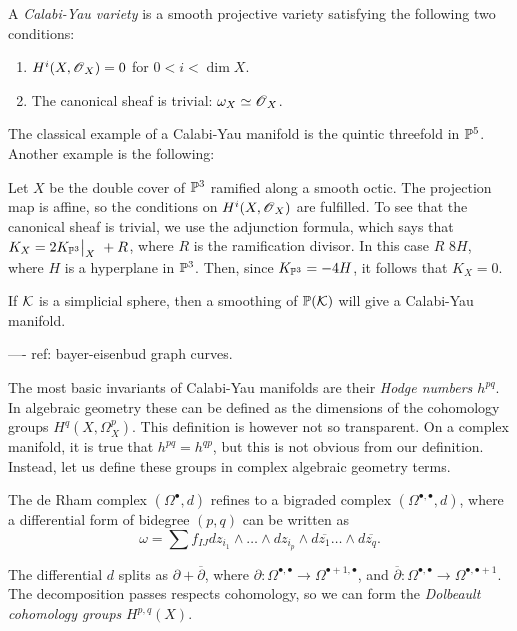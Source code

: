 \begin{defi}
A \emph{Calabi-Yau variety} is a smooth projective variety satisfying the following two conditions:
\begin{enumerate}
	\item $H^i(X,\operatorname{\mathscr{O}}_X)=0$ for $0 < i < \dim X$.
	\item The canonical sheaf is trivial: $\omega_X \simeq \operatorname{\mathscr{O}}_X$. 
\end{enumerate}
\end{defi}

The classical example of a Calabi-Yau manifold is the quintic threefold in $\mathbb{P}^5$. Another example is the following:

\begin{example}
Let $X$ be the double cover of $\mathbb{P}^3$ ramified along a smooth octic. The projection map is affine, so the conditions on $H^i(X,\operatorname{\mathscr{O}}_X)$ are fulfilled. To see that the canonical sheaf is trivial, we use the adjunction formula, which says that $K_X= 2 \restr{K_{\PP^3}}{X} + R$, where $R$ is the ramification divisor. In this case $R$ $8H$, where $H$ is a hyperplane in $\mathbb{P}^3$. Then, since $K_{\mathbb{P}^3}=-4H$, it follows that $K_X=0$.
\end{example}

If $\mathcal K$ is a simplicial sphere, then a smoothing of $\mathbb{P}(\mathcal K)$ will give a Calabi-Yau manifold.


---- ref: bayer-eisenbud graph curves.

The most basic invariants of Calabi-Yau manifolds are their \emph{Hodge numbers $h^{pq}$}. In algebraic geometry these can be defined as the dimensions of the cohomology groups $H^q(X,\Omega^p_X)$. This definition is however not so transparent. On a complex manifold, it is true that $h^{pq}=h^{qp}$, but this is not obvious from our definition. Instead, let us define these groups in complex algebraic geometry terms.

The de Rham complex $(\Omega^\bullet,d)$ refines to a bigraded complex $(\Omega^{\bullet,\bullet},d)$, where a differential form of bidegree $(p,q)$ can be written as 
$$
\omega = \sum {f_{IJ}} dz_{i_1} \wedge \ldots \wedge dz_{i_p} \wedge d\overline{z_1}\ldots \wedge d\overline{z_q}.
$$

The differential $d$ splits as $\partial + \overline \partial$, where $\partial: \Omega^{\bullet,\bullet} \to \Omega^{\bullet+1,\bullet}$, and $\overline \partial: \Omega^{\bullet,\bullet} \to \Omega^{\bullet,\bullet+1}$. The decomposition passes respects cohomology, so we can form the \emph{Dolbeault cohomology groups} $H^{p,q}(X)$. 

